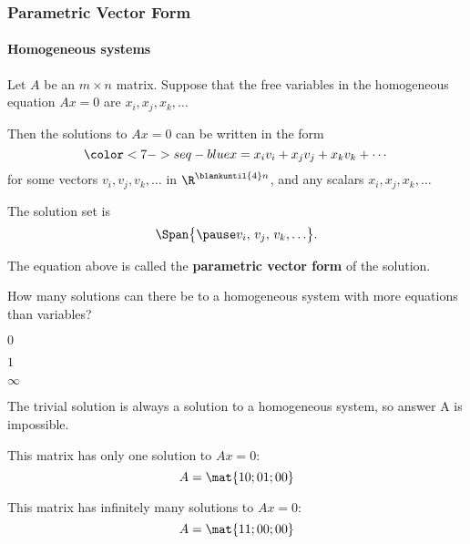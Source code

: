 
\begin{frame}
\frametitle{Parametric Vector Form}
\framesubtitle{Homogeneous systems}

Let $A$ be an $m\times n$ matrix.
\pause
Suppose that the free variables in the
homogeneous equation $Ax=0$ are $x_i,x_j,x_k,\ldots$

\pause\bigskip
Then the solutions to $Ax=0$ can be written in the form
\[ \color<7->{seq-blue} x = x_iv_i + x_jv_j + x_kv_k + \cdots \]
for some vectors $v_i,v_j,v_k,\ldots$ in $\R^{\blankuntil{4}n}$, \pause[4]
and any scalars $x_i,x_j,x_k,\ldots$

\pause\bigskip
The solution set is
\[ \Span\bigl\{ \pause v_i,\,v_j,\,v_k,\ldots\bigr\}. \]

\pause\bigskip
The \textcolor{seq-blue}{equation} above is called the
\textbf{parametric vector form} of the solution.

\end{frame}



\begin{pollframe}

\vskip-7mm\null
\begin{bluebox}[Poll]{.7\textwidth}
  How many solutions can there be to a homogeneous system with more equations
  than variables?
  \smallskip
  \begin{eAlpherate}
  \item $0$
  \item $1$
  \item $\infty$
  \end{eAlpherate}
\end{bluebox}

\pause
The trivial solution is always a solution to a homogeneous system, so answer A is
impossible.

\pause\medskip
This matrix has only one solution to $Ax=0$:
\[ A = \mat{1 0; 0 1; 0 0} \]

\pause\medskip
This matrix has infinitely many solutions to $Ax=0$:
\[ A = \mat{1 1; 0 0; 0 0} \]

\end{pollframe}



